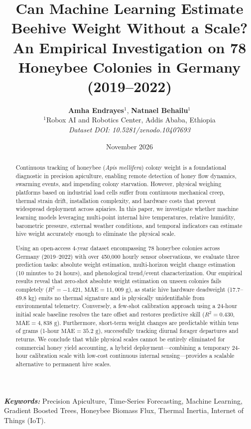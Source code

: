 \documentclass[10pt,twocolumn]{article}
\title{\textbf{\Large Can Machine Learning Estimate Beehive Weight Without a Scale?\\An Empirical Investigation on 78 Honeybee Colonies in Germany (2019--2022)}}
\author{
  \textbf{Amha Endrayes}$^1$, \textbf{Natnael Behailu}$^1$\\
  $^1$Robox AI and Robotics Center, Addis Ababa, Ethiopia\\
  \textit{Dataset DOI: 10.5281/zenodo.10407693}
}
\date{November 2026}
\begin{document}
\maketitle

\begin{abstract}
\small
Continuous tracking of honeybee (\textit{Apis mellifera}) colony weight is a foundational diagnostic in precision apiculture, enabling remote detection of honey flow dynamics, swarming events, and impending colony starvation. However, physical weighing platforms based on industrial load cells suffer from continuous mechanical creep, thermal strain drift, installation complexity, and hardware costs that prevent widespread deployment across apiaries. In this paper, we investigate whether machine learning models leveraging multi-point internal hive temperatures, relative humidity, barometric pressure, external weather conditions, and temporal indicators can estimate hive weight accurately enough to eliminate the physical scale. 

Using an open-access 4-year dataset encompassing 78 honeybee colonies across Germany (2019--2022) with over 450,000 hourly sensor observations, we evaluate three prediction tasks: absolute weight estimation, multi-horizon weight change estimation (10 minutes to 24 hours), and phenological trend/event characterization. Our empirical results reveal that zero-shot absolute weight estimation on unseen colonies fails completely ($R^2 = -1.421$, $\text{MAE} = 11,009\text{ g}$), as static hive hardware deadweight (17.7--49.8 kg) emits no thermal signature and is physically unidentifiable from environmental telemetry. Conversely, a few-shot calibration approach using a 24-hour initial scale baseline resolves the tare offset and restores predictive skill ($R^2 = 0.430$, $\text{MAE} = 4,838\text{ g}$). Furthermore, short-term weight changes are predictable within tens of grams (1-hour $\text{MAE} = 35.2\text{ g}$), successfully tracking diurnal forager departures and returns. We conclude that while physical scales cannot be entirely eliminated for commercial honey yield accounting, a hybrid deployment---combining a temporary 24-hour calibration scale with low-cost continuous internal sensing---provides a scalable alternative to permanent hive scales.
\end{abstract}

\textbf{\textit{Keywords:}} Precision Apiculture, Time-Series Forecasting, Machine Learning, Gradient Boosted Trees, Honeybee Biomass Flux, Thermal Inertia, Internet of Things (IoT).
\end{document}
